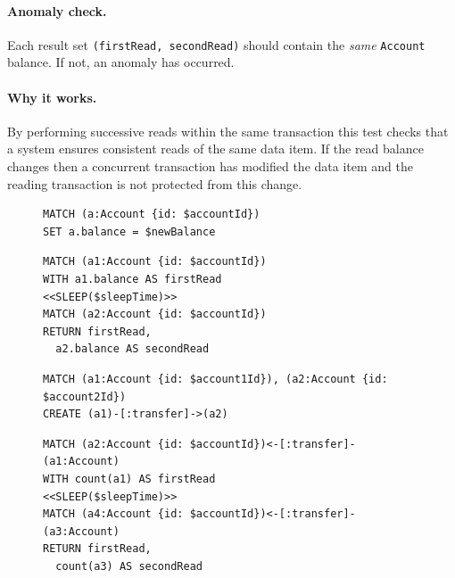 \paragraph{Anomaly check.}
Each  result set \texttt{(firstRead, secondRead)} should
contain the \emph{same} \texttt{Account} balance. If not, an  
anomaly has occurred.

\paragraph{Why it works.}
By performing successive reads within the same transaction this test checks that
a system ensures consistent reads of the same data item. If the read balance 
changes then a concurrent transaction has modified the data item and the reading
transaction is not protected from this change.

\begin{figure}[htb]
\centering
\begin{minipage}{0.35\linewidth}
\begin{lstlisting}[language=cypher,label=fig:ic1,caption=\tx{IMP $T_\mathrm{W}$}.]
MATCH (a:Account {id: $accountId})
SET a.balance = $newBalance
\end{lstlisting}
\begin{lstlisting}[language=cypher,label=fig:ic2,caption=\tx{IMP $T_\mathrm{R}$}.]
MATCH (a1:Account {id: $accountId})
WITH a1.balance AS firstRead
<<SLEEP($sleepTime)>>
MATCH (a2:Account {id: $accountId})
RETURN firstRead, 
  a2.balance AS secondRead
\end{lstlisting}
\end{minipage}
\quad
\begin{minipage}{0.61\linewidth}
\begin{lstlisting}[language=cypher,label=fig:pc1,caption=\tx{PMP $T_\mathrm{W}$}.]
MATCH (a1:Account {id: $account1Id}), (a2:Account {id: $account2Id})
CREATE (a1)-[:transfer]->(a2)
\end{lstlisting}
\begin{lstlisting}[language=cypher,label=fig:pc2,caption=\tx{PMP $T_\mathrm{R}$}.]
MATCH (a2:Account {id: $accountId})<-[:transfer]-(a1:Account)
WITH count(a1) AS firstRead
<<SLEEP($sleepTime)>>
MATCH (a4:Account {id: $accountId})<-[:transfer]-(a3:Account)
RETURN firstRead, 
  count(a3) AS secondRead
\end{lstlisting}
\end{minipage}
\end{figure}

